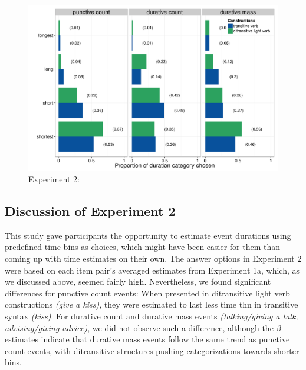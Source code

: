 \documentclass[review,12pt,authoryear]{elsarticle}
\newcommand*{\sectionformat}{\centering}
\begin{document}
\begin{figure}
\centering
\includegraphics[width=\textwidth]{./Figures/Exp2_CategorizationCategory.pdf}
\caption{Experiment 2: }
\label{fig_resCat}
\end{figure}


\subsection*{\sectionformat Discussion of Experiment 2}\label{sec_discCat}
This study gave participants the opportunity to estimate event durations using predefined time bins as choices, which might have been easier for them than coming up with time estimates on their own. The answer options in Experiment 2 were based on each item pair's averaged estimates from Experiment 1a, which, as we discussed above, seemed fairly high. Nevertheless, we found significant differences for punctive count events: When presented in ditransitive light verb constructions \emph{(give a kiss)}, they were estimated to last less time thn in transitive syntax \emph{(kiss)}. For durative count and durative mass events \emph{(talking/giving a talk, advising/giving advice)}, we did not observe such a difference, although the $\beta$-estimates indicate that durative mass events follow the same trend as punctive count events, with ditransitive structures pushing categorizations towards shorter bins. 
\end{document}
